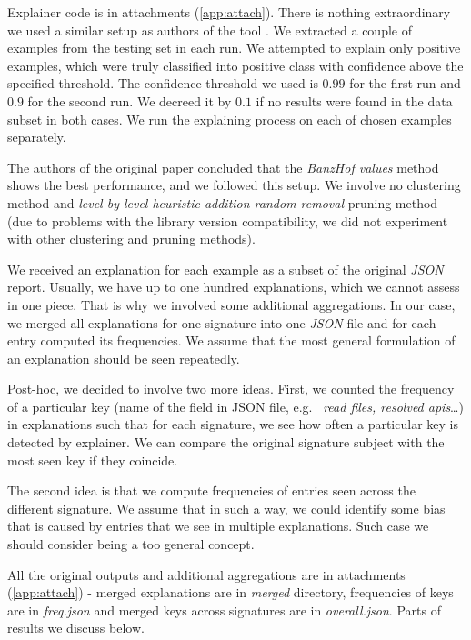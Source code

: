 Explainer code is in attachments (\ref{app:attach}). There is nothing extraordinary we used a similar setup as authors of the tool \cite{Pevny2020}. We extracted a couple of examples from the testing set in each run. We attempted to explain only positive examples, which were truly classified into positive class with confidence above the specified threshold. The confidence threshold we used is $0.99$ for the first run and $0.9$ for the second run. We decreed it by $0.1$ if no results were found in the data subset in both cases. We run the explaining process on each of chosen examples separately.

The authors of the original paper concluded that the \emph{BanzHof values} method shows the best performance, and we followed this setup. We involve no clustering method and \emph{level by level heuristic addition random removal} pruning method (due to problems with the library version compatibility, we did not experiment with other clustering and pruning methods). 

We received an explanation for each example as a subset of the original \emph{JSON} report. Usually, we have up to one hundred explanations, which we cannot assess in one piece. That is why we involved some additional aggregations. In our case, we merged all explanations for one signature into one \emph{JSON} file and for each entry computed its frequencies. We assume that the most general formulation of an explanation should be seen repeatedly. 

Post-hoc, we decided to involve two more ideas. First, we counted the frequency of a particular key (name of the field in JSON file, e.g. \ \emph{read files, resolved apis}\dots) in explanations such that for each signature, we see how often a particular key is detected by explainer. We can compare the original signature subject with the most seen key if they coincide.

The second idea is that we compute frequencies of entries seen across the different signature. We assume that in such a way, we could identify some bias that is caused by entries that we see in multiple explanations. Such case we should consider being a too general concept. 

All the original outputs and additional aggregations are in attachments (\ref{app:attach}) - merged explanations are in \emph{merged} directory, frequencies of keys are in \emph{freq.json} and merged keys across signatures are in \emph{overall.json}. Parts of results we discuss below.

